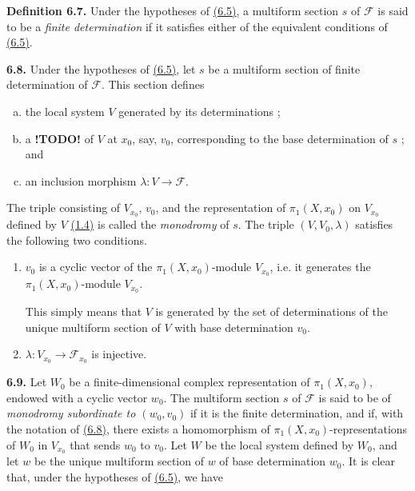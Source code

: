 \documentclass{report}
\newenvironment{rmenv}[1]
  {\phantomsection\par\medskip\noindent\textbf{#1.}\rmfamily}
  {\medskip}
\newcommand{\scr}[1]{{\mathscr{#1}}}
\newcommand{\todo}{\textbf{ !TODO! }}
\newcommand{\oldpage}[1]{\marginpar{\footnotesize$\Big\vert$ \textit{p.~#1}}}
\begin{document}
\begin{rmenv}{Definition 6.7}
\label{I.6.7}
  Under the hypotheses of \hyperref[I.6.5]{(6.5)}, a multiform section $s$ of $\scr{F}$ is said to be a \emph{finite determination} if it satisfies either of the equivalent conditions of \hyperref[I.6.5]{(6.5)}.
\end{rmenv}

\begin{rmenv}{6.8}
\label{I.6.8}
  Under the hypotheses of \hyperref[I.6.5]{(6.5)}, let $s$ be a multiform section of finite determination of $\scr{F}$.
  This section defines
\oldpage{39}
  \begin{enumerate}[a)]
    \item the local system $V$ generated by its determinations ;
    \item a \todo of $V$ at $x_0$, say, $v_0$, corresponding to the base determination of $s$ ; and
    \item an inclusion morphism $\lambda\colon V\to\scr{F}$.
  \end{enumerate}

  The triple consisting of $V_{x_0}$, $v_0$, and the representation of $\pi_1(X,x_0)$ on $V_{x_0}$ defined by $V$ \hyperref[I.1.4]{(1.4)} is called the \emph{monodromy} of $s$.
  The triple $(V,V_0,\lambda)$ satisfies the following two conditions.
  \begin{enumerate}
    \item[(6.8.1)]\label{I.6.8.1}
      $v_0$ is a cyclic vector of the $\pi_1(X,x_0)$-module $V_{x_0}$, i.e. it generates the $\pi_1(X,x_0)$-module $V_{x_0}$.

      This simply means that $V$ is generated by the set of determinations of the unique multiform section of $V$ with base determination $v_0$.
    \item[(6.8.2)]\label{I.6.8.2}
      $\lambda\colon V_{x_0}\to\scr{F}_{x_0}$ is injective.
  \end{enumerate}
\end{rmenv}

\begin{rmenv}{6.9}
\label{I.6.9}
  Let $W_0$ be a finite-dimensional complex representation of $\pi_1(X,x_0)$, endowed with a cyclic vector $w_0$.
  The multiform section $s$ of $\scr{F}$ is said to be of \emph{monodromy subordinate to $(w_0,v_0)$} if it is the finite determination, and if, with the notation of \hyperref[I.6.8]{(6.8)}, there exists a homomorphism of $\pi_1(X,x_0)$-representations of $W_0$ in $V_{x_0}$ that sends $w_0$ to $v_0$.
  Let $W$ be the local system defined by $W_0$, and let $w$ be the unique multiform section of $w$ of base determination $w_0$.
  It is clear that, under the hypotheses of \hyperref[I.6.5]{(6.5)}, we have
\end{rmenv}
\end{document}
